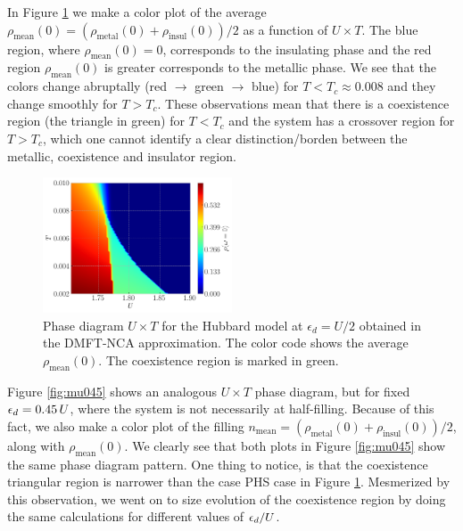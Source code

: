 \documentclass[12pt]{report}
\begin{document}
In Figure \ref{fig:triangle-mu050} we make a color plot of the average $\rho_{\text{mean}}(0) = (\rho_{\text{metal}}(0) + \rho_{\text{insul}}(0))/2$ as a function of $U \times T$. The blue region, where $\rho_{\text{mean}}(0) = 0$, corresponds to the insulating phase and the red region $\rho_{\text{mean}}(0)$ is greater corresponds to the metallic phase. We see that the colors change abruptally (red $\to$ green $\to$ blue) for $T < T_c \approx 0.008$ and they change smoothly for $T > T_c$. These observations mean that there is a coexistence region (the triangle in green) for $T < T_c$ and the system has a crossover region for $T > T_c$, which one cannot identify a clear distinction/borden between the metallic, coexistence and insulator region.

\begin{figure}[H]
\centering
\includegraphics[width=0.5\textwidth]{fig/dmft/triangle-w0-mu050.png}
\caption{Phase diagram  $U \times T$ for the Hubbard model at $\epsilon_d=U/2$ obtained in the DMFT-NCA approximation. The color code shows the average $\rho_{\text{mean}}(0)$. The coexistence region is marked in green.}
\label{fig:triangle-mu050}
\end{figure}

Figure \ref{fig:mu045} shows an analogous $U \times T$ phase diagram, but for fixed $\epsilon_d = 0.45 \, U$, where the system is not necessarily at half-filling. Because of this fact, we also make a color plot of the filling $n_{\text{mean}} = (\rho_{\text{metal}}(0) + \rho_{\text{insul}}(0))/2$, along with $\rho_{\text{mean}}(0)$. We clearly see that both plots in Figure \ref{fig:mu045} show the same phase diagram pattern. One thing to notice, is that the coexistence triangular region is narrower than the case PHS case in Figure \ref{fig:triangle-mu050}. Mesmerized by this observation, we went on to size evolution of the coexistence region by doing the same calculations for different values of $\epsilon_d/U$.
\end{document}
